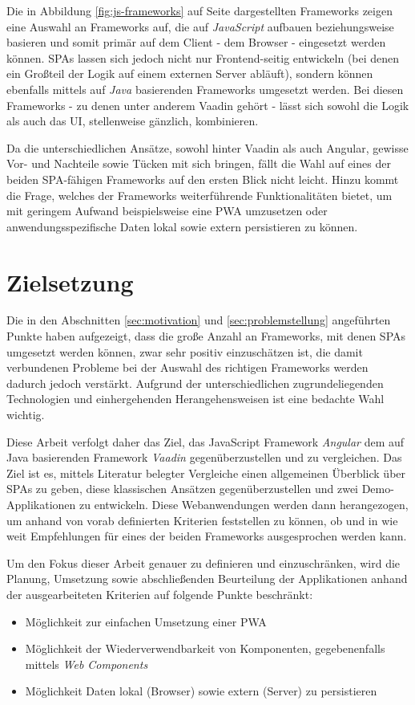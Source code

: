 \documentclass[a4paper,12pt,twoside]{scrreprt}
\begin{document}
Die in Abbildung \ref{fig:js-frameworks} auf Seite \pageref{fig:js-frameworks} dargestellten Frameworks zeigen eine Auswahl an Frameworks auf, die auf \textit{JavaScript} aufbauen beziehungsweise basieren und somit primär auf dem Client - dem Browser - eingesetzt werden können. \aclp{SPA} lassen sich jedoch nicht nur Frontend-seitig entwickeln (bei denen ein Großteil der Logik auf einem externen Server abläuft), sondern können ebenfalls mittels auf \textit{Java} basierenden Frameworks umgesetzt werden. Bei diesen Frameworks - zu denen unter anderem Vaadin gehört - lässt sich sowohl die Logik als auch das \ac{UI}, stellenweise gänzlich, kombinieren.

Da die unterschiedlichen Ansätze, sowohl hinter Vaadin als auch Angular, gewisse Vor- und Nachteile sowie Tücken mit sich bringen, fällt die Wahl auf eines der beiden \acs{SPA}-fähigen Frameworks auf den ersten Blick nicht leicht. Hinzu kommt die Frage, welches der Frameworks weiterführende Funktionalitäten bietet, um mit geringem Aufwand beispielsweise eine \ac{PWA} umzusetzen oder anwendungsspezifische Daten lokal sowie extern persistieren zu können.

\section{Zielsetzung}
\label{sec:zielsetzung}
Die in den Abschnitten \ref{sec:motivation} und \ref{sec:problemstellung} angeführten Punkte haben aufgezeigt, dass die große Anzahl an Frameworks, mit denen \aclp{SPA} umgesetzt werden können, zwar sehr positiv einzuschätzen ist, die damit verbundenen Probleme bei der Auswahl des richtigen Frameworks werden dadurch jedoch verstärkt. Aufgrund der unterschiedlichen zugrundeliegenden Technologien und einhergehenden Herangehensweisen ist eine bedachte Wahl wichtig.

Diese Arbeit verfolgt daher das Ziel, das JavaScript Framework \textit{Angular} dem auf Java basierenden Framework \textit{Vaadin} gegenüberzustellen und zu vergleichen. Das Ziel ist es, mittels Literatur belegter Vergleiche einen allgemeinen Überblick über \aclp{SPA} zu geben, diese klassischen Ansätzen gegenüberzustellen und zwei Demo-Applikationen zu entwickeln. Diese Webanwendungen werden dann herangezogen, um anhand von vorab definierten Kriterien feststellen zu können, ob und in wie weit Empfehlungen für eines der beiden Frameworks ausgesprochen werden kann.

\medskip

Um den Fokus dieser Arbeit genauer zu definieren und einzuschränken, wird die Planung, Umsetzung sowie abschließenden Beurteilung der Applikationen anhand der ausgearbeiteten Kriterien auf folgende Punkte beschränkt:
\begin{itemize}
    \item Möglichkeit zur einfachen Umsetzung einer \acf{PWA}
    \item Möglichkeit der Wiederverwendbarkeit von Komponenten, gegebenenfalls mittels \textit{Web Components}
    \item Möglichkeit Daten lokal (Browser) sowie extern (Server) zu persistieren
\end{itemize}
\end{document}
